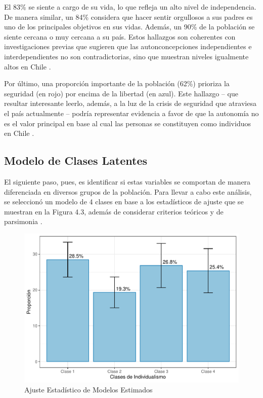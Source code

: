 \documentclass[12pt,twoside]{templates/facsothesis}
\begin{document}
El 83\% se siente a cargo de su vida, lo que refleja un alto nivel de independencia. De manera similar, un 84\% considera que hacer sentir orgullosos a sus padres es uno de los principales objetivos en sus vidas. Además, un 90\% de la población se siente cercana o muy cercana a su país. Estos hallazgos son coherentes con investigaciones previas que sugieren que las autonconcepciones independientes e interdependientes no son contradictorias, sino que muestran niveles igualmente altos en Chile \citep{benavides2020, kolstad2009}.

Por último, una proporción importante de la población (62\%) prioriza la seguridad (en rojo) por encima de la libertad (en azul). Este hallazgo -- que resultar interesante leerlo, además, a la luz de la crisis de seguridad que atraviesa el país actualmente -- podría representar evidencia a favor de que la autonomía no es el valor principal en base al cual las personas se constituyen como individuos en Chile \citep{martuccelli2010}.

\hypertarget{modelo-de-clases-latentes}{%
\subsection{Modelo de Clases Latentes}\label{modelo-de-clases-latentes}}

El siguiente paso, pues, es identificar si estas variables se comportan de manera diferenciada en diversos grupos de la población. Para llevar a cabo este análisis, se seleccionó un modelo de 4 clases en base a los estadísticos de ajuste que se muestran en la Figura 4.3, además de considerar criterios teóricos y de parsimonia \citep{collins2010}.

\begin{figure}[!ht]

{\centering \includegraphics[width=0.8\linewidth,]{tesis_files/figure-latex/unnamed-chunk-11-1} 

}

\caption{Ajuste Estadístico de Modelos Estimados}\label{fig:unnamed-chunk-11}
\end{figure}
\FloatBarrier
\end{document}
